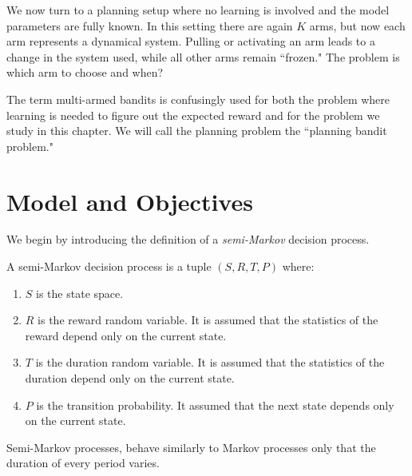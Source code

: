 


%
%
%
%
%

We now turn to a planning setup where no learning is involved and the model parameters are fully known. In this setting there are again $K$ arms, but now each arm represents a dynamical system. Pulling or activating an arm leads to a change in the system used, while all other arms remain ``frozen." The problem is which arm to choose and when?

The term multi-armed bandits is confusingly used for both the problem where learning is needed to figure out the expected reward and for the problem we study in this chapter. We will call the planning problem the ``planning bandit problem."

\section{Model and Objectives}

We begin by introducing the definition of a \emph{semi-Markov} decision process.
\begin{definition}
A semi-Markov decision process is a tuple $(S,R,T,P)$ where:
\begin{enumerate}
\item $S$ is the state space.
\item $R$ is the reward random variable. It is assumed that the statistics of the reward depend only on the current state.
\item $T$ is the duration random variable. It is assumed that the statistics of the duration depend only on the current state.
\item $P$ is the transition probability. It assumed that the next state depends only on the current state.
\end{enumerate}
Semi-Markov processes, behave similarly to Markov processes only that the duration of every period varies.
\end{definition}

